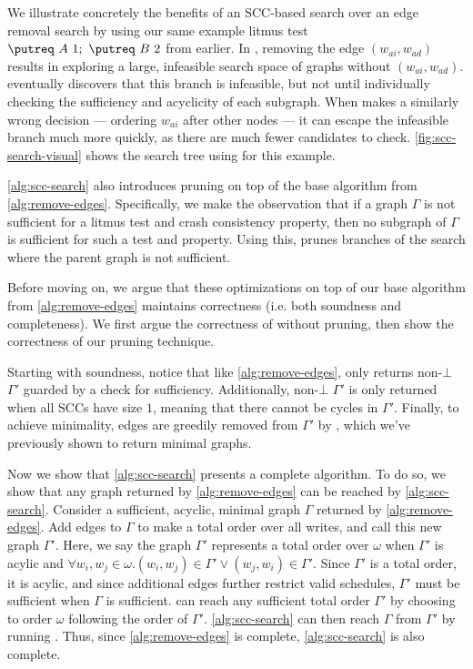 We illustrate concretely the benefits of an SCC-based search
over an edge removal search by using our same example
litmus test $ \putreq\ A\ 1;\ \putreq\ B\ 2$ from earlier.
In \graphsearch, removing the edge $(w_{ai},w_{ad})$
results in exploring a large, infeasible search space
of graphs without $(w_{ai},w_{ad})$.
\graphsearch eventually discovers that this branch is infeasible,
but not until individually checking the sufficiency and acyclicity
of each subgraph.
When \sccsearch makes a similarly wrong decision --- ordering $w_{ai}$
after other nodes --- it can escape the infeasible branch much more quickly,
as there are much fewer candidates to check.
\autoref{fig:scc-search-visual} shows the search tree using \sccsearch for this example.

\autoref{alg:scc-search} also introduces pruning on top of the base algorithm from \autoref{alg:remove-edges}.
Specifically, we make the observation that if a graph $\Gamma$ is not sufficient for a litmus test
and crash consistency property, then no subgraph of $\Gamma$ is sufficient for such a test and property.
Using this, \sccsearch prunes branches of the search where the parent graph is not sufficient.

Before moving on, we argue that these optimizations on top of our base algorithm from \autoref{alg:remove-edges}
maintains correctness (i.e. both soundness and completeness). We first argue the correctness of \sccsearch
without pruning, then show the correctness of our pruning technique.

Starting with soundness, notice that like \autoref{alg:remove-edges},
 only returns non-$\bot$ $\Gamma'$ guarded by a check for sufficiency.
Additionally, non-$\bot$ $\Gamma'$ is only returned when all SCCs have size $1$, meaning that there cannot be
cycles in $\Gamma'$. Finally, to achieve minimality, edges are greedily removed from $\Gamma'$ by
, which we've previously shown to return minimal graphs.

Now we show that \autoref{alg:scc-search} presents a complete algorithm. To do so, we show that any graph
returned by \autoref{alg:remove-edges} can be reached by \autoref{alg:scc-search}. Consider a sufficient, acyclic,
minimal graph $\Gamma$ returned by \autoref{alg:remove-edges}. Add edges to $\Gamma$ to make a total order over all
writes, and call this new graph $\Gamma'$. Here, we say the graph $\Gamma'$ represents a total order over $\omega$
when $\Gamma'$ is acylic and $\forall w_i,w_j\in\omega. (w_i,w_j)\in\Gamma' \vee (w_j,w_i)\in\Gamma'$.
Since $\Gamma'$ is a total order, it is acylic, and since additional edges further restrict valid schedules,
$\Gamma'$ must be sufficient when $\Gamma$ is sufficient.  can reach any sufficient
total order $\Gamma'$ by choosing to order $\omega$ following the order of $\Gamma'$. \autoref{alg:scc-search}
can then reach $\Gamma$ from $\Gamma'$ by running . Thus, since \autoref{alg:remove-edges}
is complete, \autoref{alg:scc-search} is also complete.

